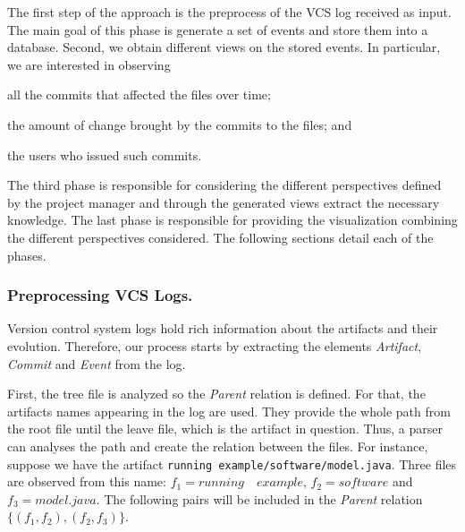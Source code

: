 The first step of the approach is the preprocess of the VCS log received as input. The main goal of this phase is generate a set of events and store them into a database. Second, we obtain different views on the stored events. In particular, we are interested in observing
\begin{inparaenum}[\itshape i)]
	\item all the commits that affected the files over time;
	\item the amount of change brought by the commits to the files; and
	\item the users who issued such commits.
\end{inparaenum}
The third phase is responsible for considering the different perspectives defined by the project manager and through the generated views extract the necessary knowledge. The last phase is responsible for providing the visualization combining the different perspectives considered. The following sections detail each of the phases.

\subsubsection{Preprocessing VCS Logs.}
Version control system logs hold rich information about the artifacts and their evolution. Therefore, our process starts by extracting the elements \emph{Artifact}, \emph{Commit} and \emph{Event} from the log.

First, the tree file is analyzed so the \emph{Parent} relation is defined. For that, the artifacts names appearing in the log are used. They provide the whole path from the root file until the leave file, which is the artifact in question. Thus, a parser can analyses the path and create the relation between the files. For instance, suppose we have the artifact \texttt{running example/software/model.java}. Three files are observed from this name: $f_1 = running \quad example$, $f_2 = software$ and $f_3 = model.java$. The following pairs will be included in the \emph{Parent} relation $\{(f_1,f_2),(f_2,f_3)\}$. 

